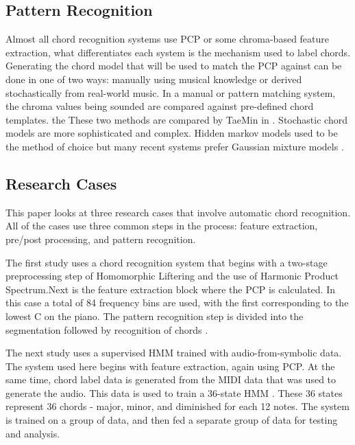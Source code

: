 \documentclass{sig-alternate}
\begin{document}
\subsection{Pattern Recognition}

Almost all chord recognition systems use PCP or some chroma-based feature extraction, what differentiates each system is the mechanism used to label chords. Generating the chord model that will be used to match the PCP against can be done in one of two ways: manually using musical knowledge or derived stochastically from real-world music. In a manual or pattern matching system, the chroma values being sounded are compared against pre-defined chord templates. the These two methods are compared by TaeMin in  \cite{TaeMin:2014}. Stochastic chord models are more sophisticated and complex. Hidden markov models used to be the method of choice but many recent systems prefer Gaussian mixture models \cite{TaeMin:2014}.


\subsection{Research Cases}
This paper looks at three research cases that involve automatic chord recognition. All of the cases use three common steps in the process: feature extraction, pre/post processing, and pattern recognition.

The first study \cite{Morman:2006} uses a chord recognition system that begins with a two-stage preprocessing step of Homomorphic Liftering and the use of Harmonic Product Spectrum.Next is the feature extraction block where the PCP is calculated. In this case a total of 84 frequency bins are used, with the first corresponding to the lowest C on the piano. The pattern recognition step is divided into the segmentation followed by recognition of chords \cite{Morman:2006}.

The next study \cite{Lee:2006} uses a supervised HMM trained with audio-from-symbolic data. The system used here begins with feature extraction, again using PCP. At the same time, chord label data is generated from the MIDI data that was used to generate the audio. This data is used to train a 36-state HMM \cite{Lee:2006}. These 36 states represent 36 chords - major, minor, and diminished for each 12 notes. The system is trained on a group of data, and then fed a separate group of data for testing and analysis. 
\end{document}
